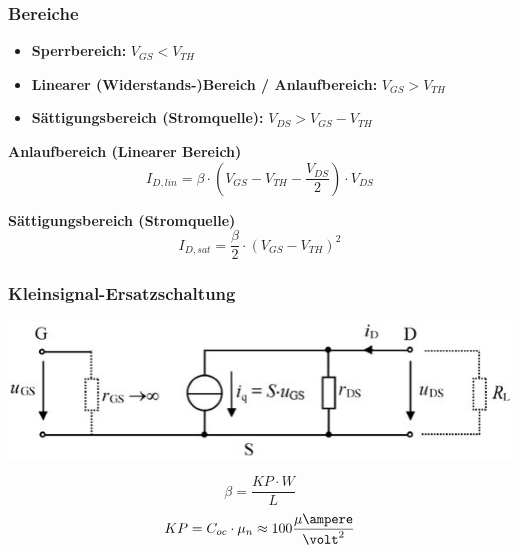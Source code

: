 \subsubsection{Bereiche}

    \begin{itemize}
        \item \textbf{Sperrbereich:} $V_{GS} < V_{TH}$ 
        \item \textbf{Linearer (Widerstands-)Bereich / Anlaufbereich:} $V_{GS} > V_{TH}$
        \item \textbf{Sättigungsbereich (Stromquelle):} $V_{DS} > V_{GS} - V_{TH}$
    \end{itemize}

    \begin{minipage}[t]{0.48\columnwidth}
        \textbf{Anlaufbereich (Linearer Bereich)}
        $$ I_{D,lin} = \beta \cdot ( V_{GS} - V_{TH} - \frac{V_{DS}}{2} ) \cdot V_{DS} $$
    \end{minipage}
    \hfill
    \begin{minipage}[t]{0.48\columnwidth}
        \textbf{Sättigungsbereich (Stromquelle)}
        $$ I_{D,sat} = \frac{\beta}{2} \cdot ( V_{GS} - V_{TH} )^2 $$
    \end{minipage}



\subsubsection{Kleinsignal-Ersatzschaltung}

    \begin{minipage}[t]{0.65\columnwidth}
        \includegraphics[align=t, width=\columnwidth]{images/mos_fet_kleinsignalersatzschaltung.png}
    \end{minipage}
    \hfill
    \begin{minipage}[t]{0.33\columnwidth}
        $$ \beta = \frac{KP \cdot W}{L} $$
        $$ KP = C_{oc} \cdot \mu_n \approx 100 \frac{\mathrm{\mu} \ampere}{\volt^2} $$  %
    \end{minipage}

